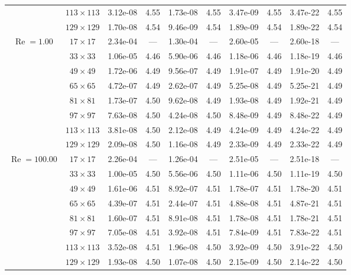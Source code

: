 \documentclass[preprint, 12pt]{elsarticle}
\begin{document}
{\begin{center}
\begin{table}[H]
{\begin{tabular*}{\textwidth}{@{\extracolsep\fill}cccccccccc@{}}
    & $113\times 113$ & 3.12e-08 & 4.55 & 1.73e-08 & 4.55 & 3.47e-09 & 4.55 & 3.47e-22 & 4.55 \\
    & $129\times 129$ & 1.70e-08 & 4.54 & 9.46e-09 & 4.54 & 1.89e-09 & 4.54 & 1.89e-22 & 4.54 \\
    \hline\hline
    \multirow{7}{*}{$\operatorname{Re}=1.00$} & $17\times 17$ & 2.34e-04 & --- & 1.30e-04 & --- & 2.60e-05 & --- & 2.60e-18 & --- \\
    & $33\times 33$ & 1.06e-05 & 4.46 & 5.90e-06 & 4.46 & 1.18e-06 & 4.46 & 1.18e-19 & 4.46 \\
    & $49\times 49$ & 1.72e-06 & 4.49 & 9.56e-07 & 4.49 & 1.91e-07 & 4.49 & 1.91e-20 & 4.49 \\
    \multirow{3}{*}{$\operatorname{Wi}=10$} & $65\times 65$ & 4.72e-07 & 4.49 & 2.62e-07 & 4.49 & 5.25e-08 & 4.49 & 5.25e-21 & 4.49 \\
    & $81\times 81$ & 1.73e-07 & 4.50 & 9.62e-08 & 4.49 & 1.93e-08 & 4.49 & 1.92e-21 & 4.49 \\
    & $97\times 97$ & 7.63e-08 & 4.50 & 4.24e-08 & 4.50 & 8.48e-09 & 4.49 & 8.48e-22 & 4.49 \\
    & $113\times 113$ & 3.81e-08 & 4.50 & 2.12e-08 & 4.49 & 4.24e-09 & 4.49 & 4.24e-22 & 4.49 \\
    & $129\times 129$ & 2.09e-08 & 4.50 & 1.16e-08 & 4.49 & 2.33e-09 & 4.49 & 2.33e-22 & 4.49 \\
    \hline
    \multirow{7}{*}{$\operatorname{Re}=100.00$} & $17\times 17$ & 2.26e-04 & --- & 1.26e-04 & --- & 2.51e-05 & --- & 2.51e-18 & --- \\
    & $33\times 33$ & 1.00e-05 & 4.50 & 5.56e-06 & 4.50 & 1.11e-06 & 4.50 & 1.11e-19 & 4.50 \\
    & $49\times 49$ & 1.61e-06 & 4.51 & 8.92e-07 & 4.51 & 1.78e-07 & 4.51 & 1.78e-20 & 4.51 \\
    \multirow{3}{*}{$\operatorname{Wi}=10$} & $65\times 65$ & 4.39e-07 & 4.51 & 2.44e-07 & 4.51 & 4.88e-08 & 4.51 & 4.87e-21 & 4.51 \\
    & $81\times 81$ & 1.60e-07 & 4.51 & 8.91e-08 & 4.51 & 1.78e-08 & 4.51 & 1.78e-21 & 4.51 \\
    & $97\times 97$ & 7.05e-08 & 4.51 & 3.92e-08 & 4.51 & 7.84e-09 & 4.51 & 7.83e-22 & 4.51 \\
    & $113\times 113$ & 3.52e-08 & 4.51 & 1.96e-08 & 4.50 & 3.92e-09 & 4.50 & 3.91e-22 & 4.50 \\
    & $129\times 129$ & 1.93e-08 & 4.50 & 1.07e-08 & 4.50 & 2.15e-09 & 4.50 & 2.14e-22 & 4.50 \\

\end{tabular*}}
\end{table}
\end{center}}
\end{document}
